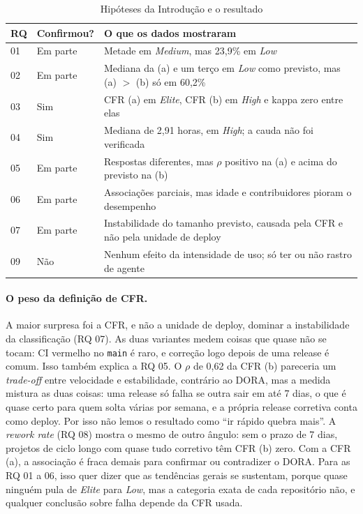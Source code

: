 \documentclass[12pt]{article}
\begin{document}
\begin{table}[ht]
\centering
\caption{Hipóteses da Introdução e o resultado}
\label{tab:hipoteses}
\small
\begin{tabular}{lp{}p{}}
\hline
RQ & Confirmou? & O que os dados mostraram \\
\hline
01 & Em parte & Metade em \textit{Medium}, mas 23,9\% em \textit{Low} \\
02 & Em parte & Mediana da (a) e um terço em \textit{Low} como previsto, mas (a) $>$ (b) só em 60,2\% \\
03 & Sim & CFR (a) em \textit{Elite}, CFR (b) em \textit{High} e kappa zero entre elas \\
04 & Sim & Mediana de 2,91 horas, em \textit{High}; a cauda não foi verificada \\
05 & Em parte & Respostas diferentes, mas $\rho$ positivo na (a) e acima do previsto na (b) \\
06 & Em parte & Associações parciais, mas idade e contribuidores pioram o desempenho \\
07 & Em parte & Instabilidade do tamanho previsto, causada pela CFR e não pela unidade de deploy \\
09 & Não & Nenhum efeito da intensidade de uso; só ter ou não rastro de agente \\
\hline
\end{tabular}
\end{table}

\paragraph{O peso da definição de CFR.} A maior surpresa foi a CFR, e não a unidade de deploy,
dominar a instabilidade da classificação (RQ 07). As duas variantes medem coisas que quase não se
tocam: CI vermelho no \texttt{main} é raro, e correção logo depois de uma release é comum. Isso
também explica a RQ 05. O $\rho$ de 0,62 da CFR (b) pareceria um \textit{trade-off} entre velocidade e
estabilidade, contrário ao DORA, mas a medida mistura as duas coisas: uma release só falha se outra
sair em até 7 dias, o que é quase certo para quem solta várias por semana, e a própria release
corretiva conta como deploy. Por isso não lemos o resultado como ``ir rápido quebra mais''. A
\textit{rework rate} (RQ 08) mostra o mesmo de outro ângulo: sem o prazo de 7 dias, projetos de ciclo
longo com quase tudo corretivo têm CFR (b) zero. Com a CFR (a), a associação é fraca demais para
confirmar ou contradizer o DORA. Para as RQ 01 a 06, isso quer dizer que as tendências gerais se
sustentam, porque quase ninguém pula de \textit{Elite} para \textit{Low}, mas a categoria exata de
cada repositório não, e qualquer conclusão sobre falha depende da CFR usada.
\end{document}
